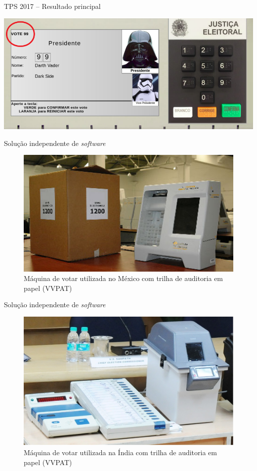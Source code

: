 \documentclass[10pt]{beamer}
\begin{document}
\begin{frame}{TPS 2017 -- Resultado principal}

\includegraphics[width=\textwidth]{tela-adulterada.png}

\end{frame}

\begin{frame}{Solução independente de \emph{software}}
\begin{figure}
\caption{Máquina de votar utilizada no México com trilha de auditoria em papel (VVPAT)}
\begin{center}
\includegraphics[scale=0.6]{mexico.jpg} 
\end{center}
\end{figure}
\end{frame}

\begin{frame}{Solução independente de \emph{software}}
\begin{figure}
\caption{Máquina de votar utilizada na Índia com trilha de auditoria em papel (VVPAT)}
\begin{center}
\includegraphics[scale=0.35]{india.jpg} 
\end{center}
\end{figure}
\end{frame}
\end{document}
